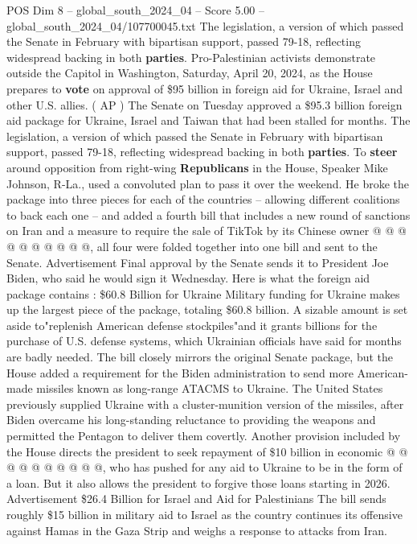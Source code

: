 \begin{textsample}{POS Dim 8 – global\_south\_2024\_04 – Score 5.00 – global\_south\_2024\_04/107700045.txt}  \label{ex:f8_pos_195}
The legislation, a version of which passed the Senate in February with bipartisan support, passed 79-18, reflecting widespread backing in both \textbf{parties}.
Pro-Palestinian activists demonstrate outside the Capitol in Washington, Saturday, April 20, 2024, as the House prepares to \textbf{vote} on approval of \$95 billion in foreign aid for Ukraine, Israel and other U.S. allies. ( AP ) The Senate on Tuesday approved a \$95.3 billion foreign aid package for Ukraine, Israel and Taiwan that had been stalled for months.
The legislation, a version of which passed the Senate in February with bipartisan support, passed 79-18, reflecting widespread backing in both \textbf{parties}.
To \textbf{steer} around opposition from right-wing \textbf{Republicans} in the House, Speaker Mike Johnson, R-La., used a convoluted plan to pass it over the weekend.
He broke the package into three pieces for each of the countries -- allowing different coalitions to back each one -- and added a fourth bill that includes a new round of sanctions on Iran and a measure to require the sale of TikTok by its Chinese owner @ @ @ @ @ @ @ @ @ @, all four were folded together into one bill and sent to the Senate.
Advertisement Final approval by the Senate sends it to President Joe Biden, who said he would sign it Wednesday.
Here is what the foreign aid package contains : \$60.8 Billion for Ukraine Military funding for Ukraine makes up the largest piece of the package, totaling \$60.8 billion.
A sizable amount is set aside to"replenish American defense stockpiles"and it grants billions for the purchase of U.S. defense systems, which Ukrainian officials have said for months are badly needed.
The bill closely mirrors the original Senate package, but the House added a requirement for the Biden administration to send more American-made missiles known as long-range ATACMS to Ukraine.
The United States previously supplied Ukraine with a cluster-munition version of the missiles, after Biden overcame his long-standing reluctance to providing the weapons and permitted the Pentagon to deliver them covertly.
Another provision included by the House directs the president to seek repayment of \$10 billion in economic @ @ @ @ @ @ @ @ @ @, who has pushed for any aid to Ukraine to be in the form of a loan.
But it also allows the president to forgive those loans starting in 2026.
Advertisement \$26.4 Billion for Israel and Aid for Palestinians The bill sends roughly \$15 billion in military aid to Israel as the country continues its offensive against Hamas in the Gaza Strip and weighs a response to attacks from Iran.

\end{textsample}
